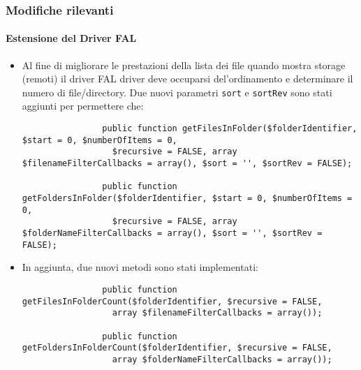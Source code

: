 \begin{frame}[fragile]
	\frametitle{Modifiche rilevanti}
	\framesubtitle{Estensione del Driver FAL}

	\lstset{basicstyle=\tiny\ttfamily}

	\begin{itemize}
		\item Al fine di migliorare le prestazioni della lista dei file quando mostra storage (remoti)
			il driver FAL driver deve occuparsi del'ordinamento e determinare il numero di file/directory. 
			Due nuovi parametri \texttt{sort} e \texttt{sortRev} sono stati aggiunti
			per permettere che:

			\begin{lstlisting}
				public function getFilesInFolder($folderIdentifier, $start = 0, $numberOfItems = 0,
				  $recursive = FALSE, array $filenameFilterCallbacks = array(), $sort = '', $sortRev = FALSE);

				public function getFoldersInFolder($folderIdentifier, $start = 0, $numberOfItems = 0,
				  $recursive = FALSE, array $folderNameFilterCallbacks = array(), $sort = '', $sortRev = FALSE);
			\end{lstlisting}

		\item In aggiunta, due nuovi metodi sono stati implementati:

			\begin{lstlisting}
				public function getFilesInFolderCount($folderIdentifier, $recursive = FALSE,
				  array $filenameFilterCallbacks = array());

				public function getFoldersInFolderCount($folderIdentifier, $recursive = FALSE,
				  array $folderNameFilterCallbacks = array());
			\end{lstlisting}

	\end{itemize}

\end{frame}

